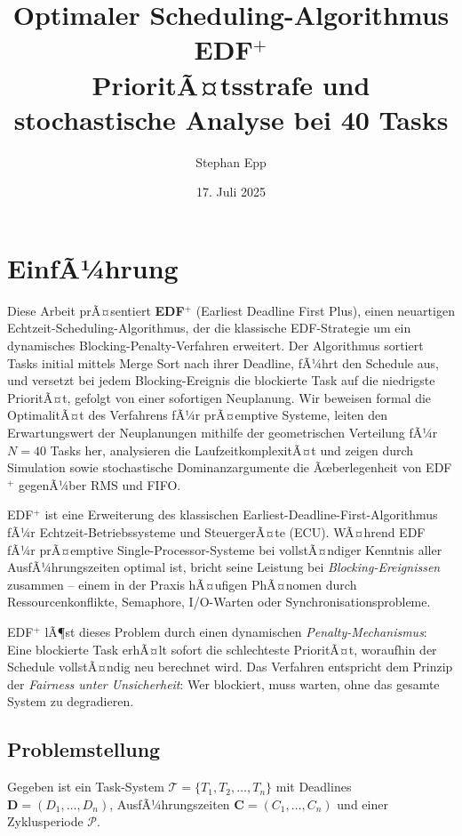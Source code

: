 ﻿\documentclass[a4paper,12pt]{article}
\title{\textbf{Optimaler Scheduling-Algorithmus EDF$^+$}\\
	PrioritÃ¤tsstrafe und stochastische Analyse bei 40 Tasks}
\author{Stephan Epp}
\date{17. Juli 2025}
\theoremstyle{definition}
\begin{document}
	
	\maketitle
	
	\tableofcontents
	\newpage
	
	\section{EinfÃ¼hrung}
	Diese Arbeit prÃ¤sentiert \textbf{EDF$^+$} (Earliest Deadline First Plus), einen neuartigen Echtzeit-Schedu\-ling-Algorithmus, der die klassische EDF-Strategie um ein
	dynamisches Blocking-Penalty-Verfahren erweitert. Der Algorithmus sortiert
	Tasks initial mittels Merge Sort nach ihrer Deadline, fÃ¼hrt den Schedule aus,
	und versetzt bei jedem Blocking-Ereignis die blockierte Task auf die niedrigste
	PrioritÃ¤t, gefolgt von einer sofortigen Neuplanung. Wir beweisen formal die
	OptimalitÃ¤t des Verfahrens fÃ¼r prÃ¤emptive Systeme, leiten den Erwartungswert
	der Neuplanungen mithilfe der geometrischen Verteilung fÃ¼r $N=40$ Tasks her,
	analysieren die LaufzeitkomplexitÃ¤t und zeigen durch Simulation sowie
	stochastische Dominanzargumente die Ãœberlegenheit von EDF$^+$ gegenÃ¼ber
	RMS und FIFO.
	
	EDF$^+$ ist eine Erweiterung des klassischen Earliest-Deadline-First-Algorithmus
	\cite{Liu1973} fÃ¼r Echtzeit-Betriebssysteme und SteuergerÃ¤te (ECU). WÃ¤hrend
	EDF fÃ¼r prÃ¤emptive Single-Processor-Systeme bei vollstÃ¤ndiger Kenntnis aller
	AusfÃ¼hrungszeiten optimal ist, bricht seine Leistung bei \emph{Blocking-Ereignissen}
	zusammen -- einem in der Praxis hÃ¤ufigen PhÃ¤nomen durch Ressourcenkonflikte,
	Semaphore, I/O-Warten oder Synchronisationsprobleme.
	
	EDF$^+$ lÃ¶st dieses Problem durch einen dynamischen \emph{Penalty-Mechanismus}:
	Eine blockierte Task erhÃ¤lt sofort die schlechteste PrioritÃ¤t, woraufhin der
	Schedule vollstÃ¤ndig neu berechnet wird. Das Verfahren entspricht dem Prinzip
	der \emph{Fairness unter Unsicherheit}: Wer blockiert, muss warten, ohne das
	gesamte System zu degradieren.
	
	\subsection{Problemstellung}
	
	Gegeben ist ein Task-System $\mathcal{T} = \{T_1, T_2, \ldots, T_n\}$ mit
	Deadlines $\mathbf{D} = (D_1, \ldots, D_n)$, AusfÃ¼hrungszeiten
	$\mathbf{C} = (C_1, \ldots, C_n)$ und einer Zyklusperiode $\mathcal{P}$.
	
\end{document}

